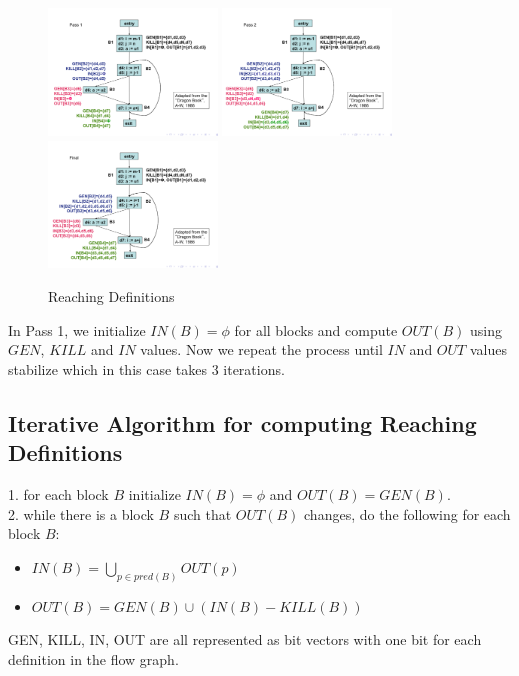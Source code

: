 \documentclass{article}
\begin{document}
\begin{figure}[h]
    \centering
    \includegraphics[width=0.4\textwidth]{Images/reaching1.png}
    \includegraphics[width=0.4\textwidth]{Images/reaching2.png}
    \includegraphics[width=0.4\textwidth]{Images/reaching3.png}
    \caption{Reaching Definitions}
    \label{fig:ReachingDefinitions}
\end{figure}

\newpage

In Pass 1, we initialize $IN(B) = \phi$ for all blocks and compute $OUT(B)$ using $GEN$, $KILL$ and $IN$ values. Now we repeat the process until $IN$ and $OUT$ values stabilize which in this case takes 3 iterations. \\

\subsection*{Iterative Algorithm for computing Reaching Definitions}
1. for each block $B$ initialize $IN(B) = \phi$ and $OUT(B) = GEN(B)$. \\
2. while there is a block $B$ such that $OUT(B)$ changes, do the following for each block $B$: \\
\begin{itemize}
    \item $IN(B) = \bigcup_{p \in pred(B)} OUT(p)$
    \item $OUT(B) = GEN(B) \cup (IN(B) - KILL(B))$
\end{itemize}

GEN, KILL, IN, OUT are all represented as bit vectors with one bit for each definition in the flow graph. \\
\end{document}
